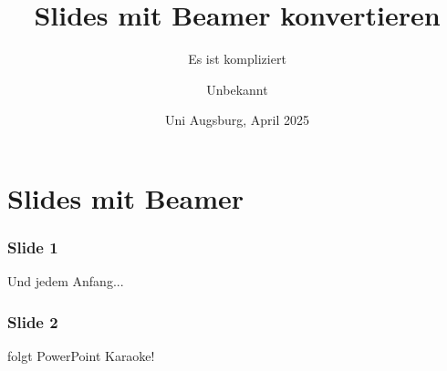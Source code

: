 \documentclass{beamer}
\title{Slides mit Beamer konvertieren}
\subtitle{Es ist kompliziert}
\author{Unbekannt}
\institute{Testlabor}
\date[2025]{Uni Augsburg, April 2025}
\begin{document}
\maketitle
\section{Slides mit Beamer}
\begin{frame}
\frametitle{Slide 1}
Und jedem Anfang...
\end{frame}
\begin{frame}
\frametitle{Slide 2}
folgt PowerPoint Karaoke!
\end{frame}
\end{document}
